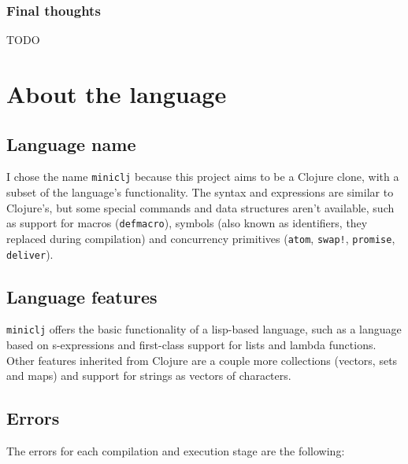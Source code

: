 \documentclass[11pt]{scrreprt}
\begin{document}
\subsection{Final thoughts}
TODO


\chapter{About the language}
\section{Language name}
I chose the name \texttt{miniclj} because this project aims to be a Clojure clone, with a subset of the language's functionality. The syntax and expressions are similar to Clojure's, but some special commands and data structures aren't available, such as support for macros (\texttt{defmacro}), symbols (also known as identifiers, they replaced during compilation) and concurrency primitives (\texttt{atom}, \texttt{swap!}, \texttt{promise}, \texttt{deliver}).

\section{Language features}
\texttt{miniclj} offers the basic functionality of a lisp-based language, such as a language based on s-expressions and first-class support for lists and lambda functions. Other features inherited from Clojure are a couple more collections (vectors, sets and maps) and support for strings as vectors of characters.

\section{Errors}
The errors for each compilation and execution stage are the following:
\end{document}
